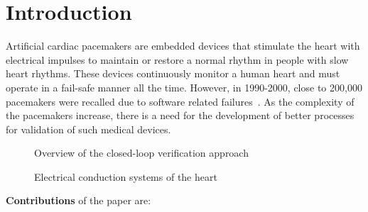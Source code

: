 \section{Introduction}

Artificial cardiac pacemakers are embedded devices that 
stimulate the heart with electrical impulses to 
maintain or restore a normal rhythm in people with slow heart rhythms.
These devices continuously monitor a human heart and must operate in a 
fail-safe manner all the time. 
However, in 1990-2000, close to 200,000 pacemakers were 
recalled due to software related failures~\cite{alemzadeh13}.
As the complexity of the pacemakers increase, there is a need for the
development of better processes for validation of such
medical devices.




\begin{figure}[bthp]
  \centering \scalebox{0.7}{  }
  \caption{Overview of the closed-loop verification
    approach \label{fig:overview}}
\end{figure}

\begin{figure*}[hbpt]
  \centering 
  \caption{Electrical conduction systems of the heart}
  \label{fig:heartOverview}
\end{figure*}

\textbf{Contributions} of the paper are:  



